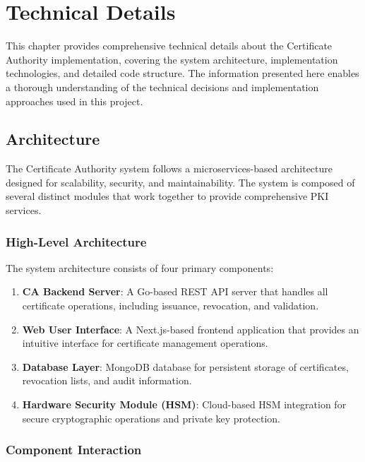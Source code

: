 \chapter{Technical Details}
\label{Tools}

This chapter provides comprehensive technical details about the Certificate Authority implementation, covering the system architecture, implementation technologies, and detailed code structure. The information presented here enables a thorough understanding of the technical decisions and implementation approaches used in this project.

\section{Architecture}

The Certificate Authority system follows a microservices-based architecture designed for scalability, security, and maintainability. The system is composed of several distinct modules that work together to provide comprehensive PKI services.

\subsection{High-Level Architecture}

The system architecture consists of four primary components:

\begin{enumerate}
    \item \textbf{CA Backend Server}: A Go-based REST API server that handles all certificate operations, including issuance, revocation, and validation.
    
    \item \textbf{Web User Interface}: A Next.js-based frontend application that provides an intuitive interface for certificate management operations.
    
    \item \textbf{Database Layer}: MongoDB database for persistent storage of certificates, revocation lists, and audit information.
    
    \item \textbf{Hardware Security Module (HSM)}: Cloud-based HSM integration for secure cryptographic operations and private key protection.
\end{enumerate}

\subsection{Component Interaction}

